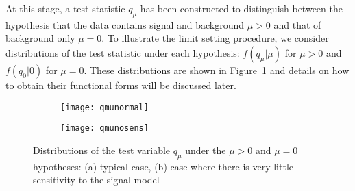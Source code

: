 At this stage, a test statistic $q_{\mu}$ has been constructed to distinguish between the hypothesis 
that the data contains signal and background $\mu>0$ and that of background only $\mu=0$.
To illustrate the limit setting procedure, we consider distributions of the test statistic under each 
hypothesis: $f\left(q_{\mu} \rvert \mu\right)$ for $\mu>0$ and $f\left(q_{0} \rvert 0\right)$ for $\mu=0$.
These distributions are shown in Figure~\ref{fig:stat.limit.qmunormal} and details on how to obtain their functional forms
 will be discussed later. 

\begin{figure}[t]
\centering
\begin{subfigure}[t]{0.45\textwidth}\texttt{[image: qmunormal]}\caption{}\label{fig:stat.limit.qmunormal}\end{subfigure}
\begin{subfigure}[t]{0.467\textwidth}\texttt{[image: qmunosens]}\caption{}\label{fig:stat.limit.qmunosens}\end{subfigure}
\caption{Distributions of the test variable $q_{\mu}$ under the $\mu>0$ and $\mu=0$ hypotheses: (a) typical case, 
  (b) case where there is very little sensitivity to the signal model}
\label{fig:stat.limit.qmu}
\end{figure}

